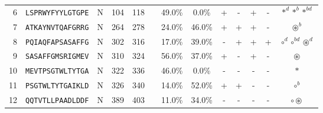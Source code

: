 \begin{tabular}{rcccccccccccc}
6  &  \texttt{LSPRWYFYYLGTGPE} &       N &    104 &   118 &                                                                  &                          49.0\% &                            0.0\% &          + &           - &          + &           - &                                                                                                           $ \ast^d \ast^b \ast^{bd} $ \\
7  &  \texttt{ATKAYNVTQAFGRRG} &       N &    264 &   278 &                                                                  &                          24.0\% &                           46.0\% &          + &           + &          + &           - &                                                                                                                     $ \circledast^b $ \\
8  &  \texttt{PQIAQFAPSASAFFG} &       N &    302 &   316 &                                                                  &                          17.0\% &                           39.0\% &          - &           + &          + &           + &                                                                                                  $ \circ^d \circ^{bd} \circledast^d $ \\
9  &  \texttt{SASAFFGMSRIGMEV} &       N &    310 &   324 &                                                                  &                          56.0\% &                           37.0\% &          + &           - &          + &           - &                                                                                                                       $ \circledast $ \\
10 &  \texttt{MEVTPSGTWLTYTGA} &       N &    322 &   336 &                                                                  &                          46.0\% &                            0.0\% &          - &           - &          - &           - &                                                                                                                              $ \ast $ \\
11 &  \texttt{PSGTWLTYTGAIKLD} &       N &    326 &   340 &                                                                  &                          14.0\% &                           52.0\% &          + &           + &          - &           - &                                                                                                                           $ \circ^b $ \\
12 &  \texttt{QQTVTLLPAADLDDF} &       N &    389 &   403 &                                                                  &                          11.0\% &                           34.0\% &          - &           - &          - &           - &                                                                                                                 $ \circ \circledast $ \\

\end{tabular}
